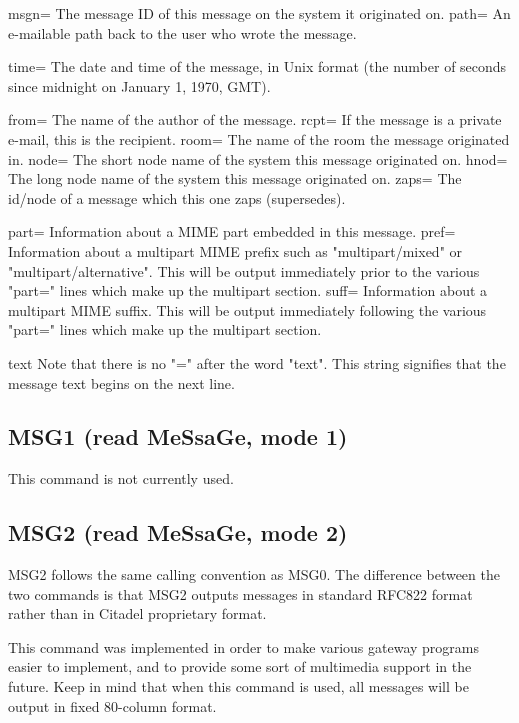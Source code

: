  msgn=   The message ID of this message on the system it originated on.
 path=   An e-mailable path back to the user who wrote the message.

 time=   The date and time of the message, in Unix format (the number of
seconds since midnight on January 1, 1970, GMT).

 from=   The name of the author of the message.
 rcpt=   If the message is a private e-mail, this is the recipient.
 room=   The name of the room the message originated in.
 node=   The short node name of the system this message originated on.
 hnod=   The long node name of the system this message originated on.
 zaps=   The id/node of a message which this one zaps (supersedes).

 part=   Information about a MIME part embedded in this message.
 pref=   Information about a multipart MIME prefix such as "multipart/mixed"
         or "multipart/alternative".  This will be output immediately prior
         to the various "part=" lines which make up the multipart section.
 suff=   Information about a multipart MIME suffix.  This will be output
         immediately following the various "part=" lines which make up the
         multipart section.

 text    Note that there is no "=" after the word "text".  This string
signifies that the message text begins on the next line.



\subsection{MSG1 (read MeSsaGe, mode 1)}

 This command is not currently used.



\subsection{MSG2 (read MeSsaGe, mode 2)}

 MSG2 follows the same calling convention as MSG0.  The difference between
the two commands is that MSG2 outputs messages in standard RFC822 format
rather than in Citadel proprietary format.

 This command was implemented in order to make various gateway programs
easier to implement, and to provide some sort of multimedia support in the
future.  Keep in mind that when this command is used, all messages will be
output in fixed 80-column format.



